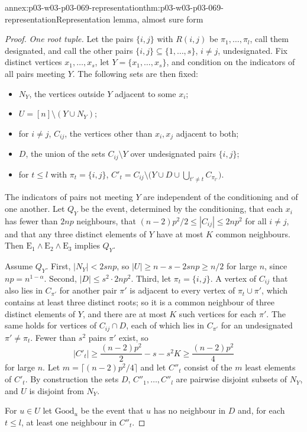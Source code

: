 \begin{annexitem}{annex:p03-w03-p03-069-representation}{thm:p03-w03-p03-069-representation}{Representation lemma, almost sure form}
\begin{proof}
\emph{One root tuple.}  Let the pairs \(\{i,j\}\) with \(R(i,j)\) be
\(\pi_1,\ldots,\pi_l\), call them designated, and call the other pairs
\(\{i,j\}\subseteq\{1,\ldots,s\}\), \(i\neq j\), undesignated.  Fix distinct
vertices \(x_1,\ldots,x_s\), let \(Y=\{x_1,\ldots,x_s\}\), and condition on
the indicators of all pairs meeting \(Y\).  The following sets are then
fixed:
\begin{itemize}
\item \(N_Y\), the vertices outside \(Y\) adjacent to some \(x_i\);
\item \(U=[n]\setminus(Y\cup N_Y)\);
\item for \(i\neq j\), \(C_{ij}\), the vertices other than \(x_i,x_j\)
adjacent to both;
\item \(D\), the union of the sets \(C_{ij}\setminus Y\) over undesignated
pairs \(\{i,j\}\);
\item for \(t\leq l\) with \(\pi_t=\{i,j\}\),
\(C'_t=C_{ij}\setminus\bigl(Y\cup D\cup\bigcup_{t'\neq t}C_{\pi_{t'}}\bigr)\).
\end{itemize}
The indicators of pairs not meeting \(Y\) are independent of the conditioning
and of one another.  Let \(Q_Y\) be the event, determined by the conditioning,
that each \(x_i\) has fewer than \(2np\) neighbours, that
\((n-2)p^2/2\leq|C_{ij}|\leq2np^2\) for all \(i\neq j\), and that any three
distinct elements of \(Y\) have at most \(K\) common neighbours.  Then
\(\mathrm E_1\wedge\mathrm E_2\wedge\mathrm E_3\) implies \(Q_Y\).

Assume \(Q_Y\).  First, \(|N_Y|<2snp\), so \(|U|\geq n-s-2snp\geq n/2\) for
large \(n\), since \(np=n^{1-\alpha}\).  Second, \(|D|\leq s^2\cdot2np^2\).
Third, let \(\pi_t=\{i,j\}\).  A vertex of \(C_{ij}\) that also lies in
\(C_{\pi'}\) for another pair \(\pi'\) is adjacent to every vertex of
\(\pi_t\cup\pi'\), which contains at least three distinct roots; so it is a
common neighbour of three distinct elements of \(Y\), and there are at most
\(K\) such vertices for each \(\pi'\).  The same holds for vertices of
\(C_{ij}\cap D\), each of which lies in \(C_{\pi'}\) for an undesignated
\(\pi'\neq\pi_t\).  Fewer than \(s^2\) pairs \(\pi'\) exist, so
\[
  |C'_t|\geq\frac{(n-2)p^2}{2}-s-s^2K\geq\frac{(n-2)p^2}{4}
\]
for large \(n\).  Let \(m=\lceil(n-2)p^2/4\rceil\) and let \(C''_t\) consist of
the \(m\) least elements of \(C'_t\).  By construction the sets
\(D\), \(C''_1,\ldots,C''_l\) are pairwise disjoint subsets of \(N_Y\), and
\(U\) is disjoint from \(N_Y\).

For \(u\in U\) let \(\mathrm{Good}_u\) be the event that \(u\) has no
neighbour in \(D\) and, for each \(t\leq l\), at least one neighbour in
\(C''_t\).


\end{proof}
\end{annexitem}
